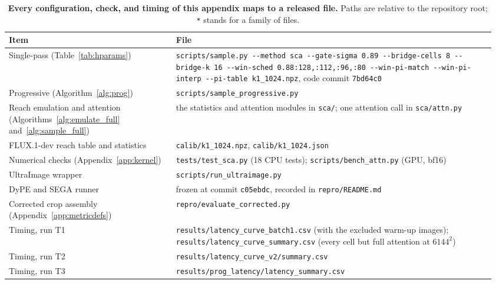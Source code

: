 \begin{table}[!htbp]
  \caption{\textbf{Every configuration, check, and timing of this appendix maps to a released file.} Paths are relative to the repository root; \texttt{*} stands for a family of files.}
  \label{tab:sources}
  \centering\footnotesize
  \setlength{\tabcolsep}{4pt}
  \begin{tabular}{@{}>{\raggedright\arraybackslash}p{0.33\linewidth}>{\raggedright\arraybackslash}p{0.63\linewidth}@{}}
    \toprule
    Item & File \\
    \midrule
    Single-pass \sca{} (Table~\ref{tab:hparams}) & \texttt{scripts/\allowbreak sample.py -{}-method sca -{}-gate-sigma 0.89 -{}-bridge-cells 8 -{}-bridge-k 16 -{}-win-sched 0.88:128,\allowbreak 0.86:112,\allowbreak 0.84:96,\allowbreak 0.82:80 -{}-win-pi-match -{}-win-pi-interp -{}-pi-table k1\_1024.npz}, code commit \texttt{7bd64c0} \\
    Progressive \sca{} (Algorithm~\ref{alg:prog}) & \texttt{scripts/\allowbreak sample\_progressive.py} \\
    Reach emulation and \sca{} attention (Algorithms~\ref{alg:emulate_full} and~\ref{alg:sample_full}) & the statistics and attention modules in \texttt{sca/}; one attention call in \texttt{sca/\allowbreak attn.py} \\
    FLUX.1-dev reach table and statistics & \texttt{calib/\allowbreak k1\_1024.npz}, \texttt{calib/\allowbreak k1\_1024.json} \\
    Numerical checks (Appendix~\ref{app:kernel}) & \texttt{tests/\allowbreak test\_sca.py} (18 CPU tests); \texttt{scripts/\allowbreak bench\_attn.py} (GPU, bf16) \\
    UltraImage wrapper & \texttt{scripts/\allowbreak run\_ultraimage.py} \\
    DyPE and SEGA runner & frozen at commit \texttt{c05ebdc}, recorded in \texttt{repro/\allowbreak README.md} \\
    Corrected crop assembly (Appendix~\ref{app:metricdefs}) & \texttt{repro/\allowbreak evaluate\_corrected.py} \\
    \midrule
    Timing, run T1 & \texttt{results/\allowbreak latency\_curve\_batch1.csv} (with the excluded warm-up images); \texttt{results/\allowbreak latency\_curve\_summary.csv} (every cell but full attention at $6144^2$) \\
    Timing, run T2 & \texttt{results/\allowbreak latency\_curve\_v2/\allowbreak summary.csv} \\
    Timing, run T3 & \texttt{results/\allowbreak prog\_latency/\allowbreak latency\_summary.csv} \\

\end{tabular}
\end{table}
